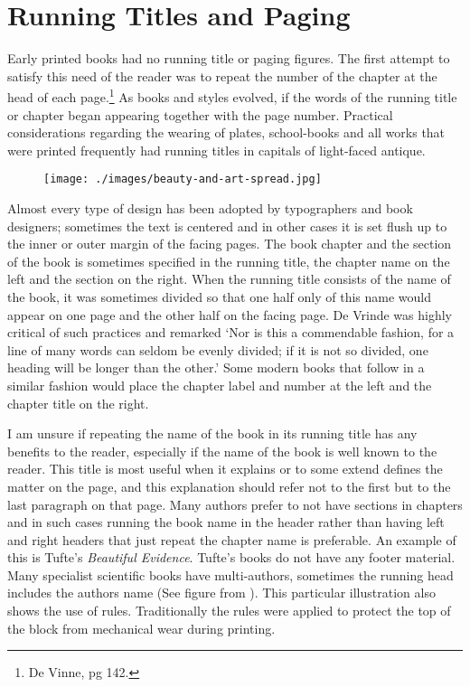 

\chapter{Running Titles and Paging}

Early printed books had no running title or paging figures. The first attempt to satisfy this need of the reader was to repeat the number of the chapter at the head of each page.\footnote{De Vinne, pg 142.}  As books and styles evolved, if the words of the running title or chapter began appearing together with the page number. Practical considerations regarding the wearing of plates, school-books and all works that were printed frequently had running titles in capitals of light-faced antique. 

\begin{figure}[htp]
\texttt{[image: ./images/beauty-and-art-spread.jpg]}
\end{figure}

Almost every type of design has been adopted by typographers and book designers; sometimes the text is centered and in other cases it is set flush up to the inner or outer margin of the facing pages. The book chapter and the section of the book is sometimes specified in the running title, the chapter name on the left and the section on the right. When the running title consists of the name of the book, it was sometimes divided so that one half only of this name would appear on one page and the other half on the facing page. De Vrinde was highly critical of such practices and remarked `Nor is this a commendable fashion, for a line of many words can seldom be evenly divided; if it is not so divided, one heading will be longer than the other.’  Some modern books that follow in a similar fashion would place the chapter label and number at the left and the chapter title on the right. 

I am unsure if repeating the name of the book in its running title has any benefits to the reader, especially if the name of the book is well known to the reader. This title is most useful when it explains or to some extend defines the matter on the page, and this explanation should refer not to the first but to the last paragraph on that page.  Many authors prefer to not have sections in chapters and in such cases running the book name in the header rather than having left and right headers that just repeat the chapter name is preferable. An example of this is Tufte’s \textit{Beautiful Evidence}.  Tufte’s books do not have any footer material.  Many specialist scientific books have multi-authors, sometimes the running head includes the authors name (See figure from ). This particular illustration also shows the use of rules. Traditionally the rules were applied to protect the top of the block from mechanical wear during printing. 

